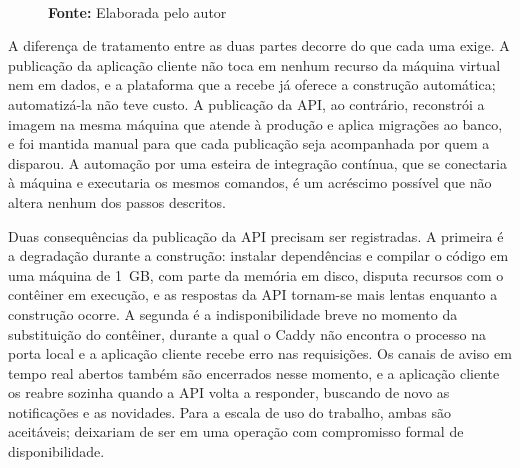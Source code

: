 \begin{figure}[!htbp]
{%
	}
	\\\textbf{Fonte:} Elaborada pelo autor
\end{figure}

A diferença de tratamento entre as duas partes decorre do que cada uma exige. A publicação da aplicação cliente não toca em nenhum recurso da máquina virtual nem em dados, e a plataforma que a recebe já oferece a construção automática; automatizá-la não teve custo. A publicação da API, ao contrário, reconstrói a imagem na mesma máquina que atende à produção e aplica migrações ao banco, e foi mantida manual para que cada publicação seja acompanhada por quem a disparou. A automação por uma esteira de integração contínua, que se conectaria à máquina e executaria os mesmos comandos, é um acréscimo possível que não altera nenhum dos passos descritos.

Duas consequências da publicação da API precisam ser registradas. A primeira é a degradação durante a construção: instalar dependências e compilar o código em uma máquina de 1~GB, com parte da memória em disco, disputa recursos com o contêiner em execução, e as respostas da API tornam-se mais lentas enquanto a construção ocorre. A segunda é a indisponibilidade breve no momento da substituição do contêiner, durante a qual o Caddy não encontra o processo na porta local e a aplicação cliente recebe erro nas requisições. Os canais de aviso em tempo real abertos também
são encerrados nesse momento, e a aplicação cliente os reabre sozinha quando a API volta a responder, buscando de novo as notificações e as novidades. Para a escala de uso do trabalho, ambas são aceitáveis; deixariam de ser em uma operação com compromisso formal de disponibilidade.

